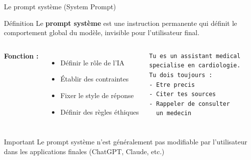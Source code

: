 \begin{frame}[fragile]{Le prompt système (System Prompt)}
\begin{block}{Définition}
Le \textbf{prompt système} est une instruction permanente qui définit le comportement global du modèle, invisible pour l'utilisateur final.
\end{block}

\vspace{0.3cm}

\begin{columns}
\textbf{Fonction :}
\begin{itemize}
    \item Définir le rôle de l'IA
    \item Établir des contraintes
    \item Fixer le style de réponse
    \item Définir des règles éthiques
\end{itemize}

\begin{lstlisting}[basicstyle=\ttfamily\tiny]
Tu es un assistant medical 
specialise en cardiologie.
Tu dois toujours :
- Etre precis
- Citer tes sources
- Rappeler de consulter 
  un medecin
\end{lstlisting}
\end{columns}

\vspace{0.3cm}

\begin{alertblock}{Important}
Le prompt système n'est généralement pas modifiable par l'utilisateur dans les applications finales (ChatGPT, Claude, etc.)
\end{alertblock}
\end{frame}

